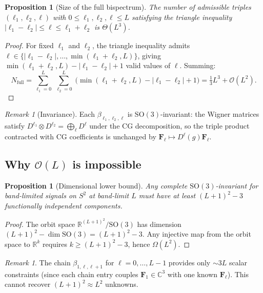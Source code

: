 \documentclass{article}
\newtheorem{proposition}[theorem]{Proposition}
\theoremstyle{definition}
\theoremstyle{remark}
\newtheorem{remark}[theorem]{Remark}
\newcommand{\R}{\mathbb{R}}
\newcommand{\C}{\mathbb{C}}
\newcommand{\SO}{\mathrm{SO}}
\theoremstyle{definition}
\begin{document}
\begin{proposition}[Size of the full bispectrum]\label{prop:app-full-size}
The number of admissible triples $(\ell_1, \ell_2, \ell)$ with
$0 \le \ell_1, \ell_2, \ell \le L$ satisfying the triangle inequality
$|\ell_1 - \ell_2| \le \ell \le \ell_1 + \ell_2$ is $\Theta(L^3)$.
\end{proposition}
\begin{proof}
For fixed $\ell_1$ and $\ell_2$, the triangle inequality admits
$\ell \in \{|\ell_1 - \ell_2|, \dotsc, \min(\ell_1 + \ell_2, L)\}$,
giving $\min(\ell_1 + \ell_2, L) - |\ell_1 - \ell_2| + 1$ valid
values of $\ell$. Summing:
\[
  N_{\mathrm{full}}
  = \sum_{\ell_1=0}^{L}\;\sum_{\ell_2=0}^{L}\;
    \bigl(\min(\ell_1+\ell_2,L) - |\ell_1-\ell_2| + 1\bigr)
  = \tfrac{1}{3}L^3 + \mathcal{O}(L^2).
\]
\end{proof}

\begin{remark}[Invariance]
Each $\beta_{\ell_1,\ell_2,\ell}$ is $\SO(3)$-invariant: the Wigner
matrices satisfy $D^{\ell_1} \otimes D^{\ell_2}
= \bigoplus_\ell D^\ell$ under the CG decomposition, so the triple
product contracted with CG coefficients is unchanged by
$\mathbf{F}_\ell \mapsto D^\ell(g)\mathbf{F}_\ell$.
\end{remark}

\subsection{Why $\mathcal{O}(L)$ is impossible}

\begin{proposition}[Dimensional lower bound]\label{prop:app-lower-bound}
Any complete $\SO(3)$-invariant for band-limited signals on $S^2$
at band-limit $L$ must have at least $(L+1)^2 - 3$ functionally
independent components.
\end{proposition}
\begin{proof}
The orbit space $\R^{(L+1)^2} / \SO(3)$ has dimension
$(L+1)^2 - \dim\SO(3) = (L+1)^2 - 3$. Any injective map from the
orbit space to $\R^k$ requires $k \ge (L+1)^2 - 3$, hence
$\Omega(L^2)$.
\end{proof}

\begin{remark}
The chain $\beta_{1,\ell,\ell+1}$ for $\ell = 0, \dotsc, L-1$ provides
only $\sim 3L$ scalar constraints (since each chain entry couples
$\mathbf{F}_1 \in \C^3$ with one known $\mathbf{F}_\ell$). This cannot
recover $(L+1)^2 \approx L^2$ unknowns.
\end{remark}
\end{document}
